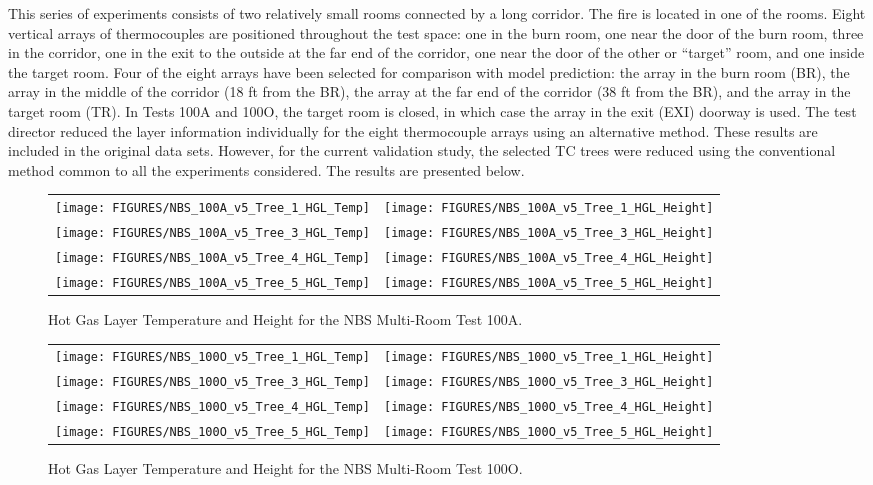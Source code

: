 This series of experiments consists of two relatively small rooms connected by a long corridor. The fire is located in one of the rooms.  Eight
vertical arrays of thermocouples are positioned throughout the test space: one in the burn room, one near the door of the burn room, three in the
corridor, one in the exit to the outside at the far end of the corridor, one near the door of the other or ``target'' room, and one inside the target
room.  Four of the eight arrays have been selected for comparison with model prediction: the array in the burn room (BR), the array in the middle of
the corridor (18 ft from the BR), the array at the far end of the corridor (38 ft from the BR), and the array in the target room (TR).  In Tests 100A
and 100O, the target room is closed, in which case the array in the exit (EXI) doorway is used. The test director reduced the layer information
individually for the eight thermocouple arrays using an alternative method. These results are included in the original data sets. However, for the
current validation study, the selected TC trees were reduced using the conventional method common to all the experiments considered.  The results are
presented below.


\begin{figure}[p]
\begin{tabular*}{\textwidth}{l@{\extracolsep{\fill}}r}
\texttt{[image: FIGURES/NBS\_100A\_v5\_Tree\_1\_HGL\_Temp]} &
\texttt{[image: FIGURES/NBS\_100A\_v5\_Tree\_1\_HGL\_Height]} \\
\texttt{[image: FIGURES/NBS\_100A\_v5\_Tree\_3\_HGL\_Temp]} &
\texttt{[image: FIGURES/NBS\_100A\_v5\_Tree\_3\_HGL\_Height]} \\
\texttt{[image: FIGURES/NBS\_100A\_v5\_Tree\_4\_HGL\_Temp]} &
\texttt{[image: FIGURES/NBS\_100A\_v5\_Tree\_4\_HGL\_Height]} \\
\texttt{[image: FIGURES/NBS\_100A\_v5\_Tree\_5\_HGL\_Temp]} &
\texttt{[image: FIGURES/NBS\_100A\_v5\_Tree\_5\_HGL\_Height]}
\end{tabular*}
\caption{Hot Gas Layer Temperature and Height for the NBS Multi-Room Test 100A.} \label{NBS_100A_HGL}
\end{figure}

\begin{figure}[p]
\begin{tabular*}{\textwidth}{l@{\extracolsep{\fill}}r}
\texttt{[image: FIGURES/NBS\_100O\_v5\_Tree\_1\_HGL\_Temp]} &
\texttt{[image: FIGURES/NBS\_100O\_v5\_Tree\_1\_HGL\_Height]} \\
\texttt{[image: FIGURES/NBS\_100O\_v5\_Tree\_3\_HGL\_Temp]} &
\texttt{[image: FIGURES/NBS\_100O\_v5\_Tree\_3\_HGL\_Height]} \\
\texttt{[image: FIGURES/NBS\_100O\_v5\_Tree\_4\_HGL\_Temp]} &
\texttt{[image: FIGURES/NBS\_100O\_v5\_Tree\_4\_HGL\_Height]} \\
\texttt{[image: FIGURES/NBS\_100O\_v5\_Tree\_5\_HGL\_Temp]} &
\texttt{[image: FIGURES/NBS\_100O\_v5\_Tree\_5\_HGL\_Height]}
\end{tabular*}
\caption{Hot Gas Layer Temperature and Height for the NBS Multi-Room Test 100O.} \label{NBS_100O_HGL}
\end{figure}

